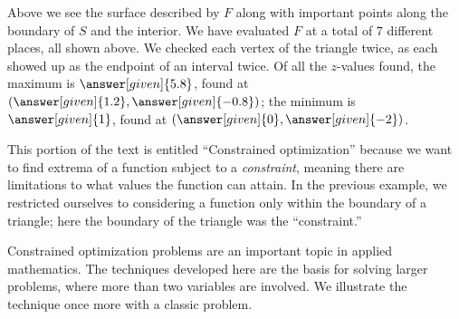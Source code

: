 \documentclass{ximera}
\begin{document}
\begin{example}
\begin{explanation}
\begin{image}
    \end{image}
    Above we see the surface described by $F$ along with important
    points along the boundary of $S$ and the interior.  We have
    evaluated $F$ at a total of $7$ different places, all shown
    above. We checked each vertex of the triangle twice, as each
    showed up as the endpoint of an interval twice. Of all the
    $z$-values found, the maximum is $\answer[given]{5.8}$, found at
    $\left(\answer[given]{1.2},\answer[given]{-0.8}\right)$; the
    minimum is $\answer[given]{1}$, found at
    $(\answer[given]{0},\answer[given]{-2})$.
  \end{explanation}
\end{example}

This portion of the text is entitled ``Constrained optimization''
because we want to find extrema of a function subject to a
\textit{constraint}, meaning there are limitations to what values the
function can attain. In the previous example, we restricted ourselves
to considering a function only within the boundary of a triangle; here
the boundary of the triangle was the ``constraint.''


Constrained optimization problems are an important topic in applied
mathematics. The techniques developed here are the basis for solving
larger problems, where more than two variables are involved.  We
illustrate the technique once more with a classic problem.
\end{document}
